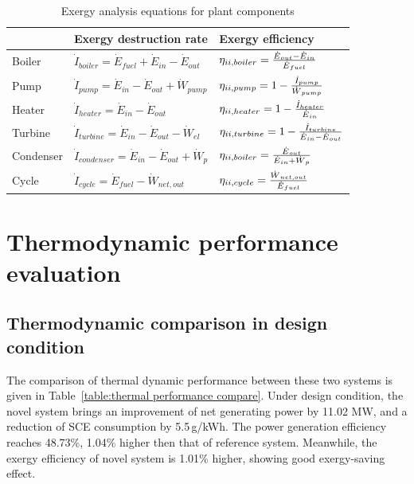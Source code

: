 \documentclass[preprint,12pt]{elsarticle}
\begin{document}

\begin{table}
\caption{Exergy analysis equations for plant components}
\label{tab:exergy equation}
\centering
\begin{tabular}{lll}
\toprule 
 & Exergy destruction rate  & Exergy efficiency\tabularnewline
\midrule
Boiler & $\dot{I}_{boiler}=\dot{E}{}_{fuel}+\dot{E}{}_{in}-\dot{E}{}_{out}$ & $\eta_{\uppercase\expandafter{\romannumeral2},boiler}=\frac{\dot{E}{}_{out}-\dot{E}{}_{in}}{\dot{E}{}_{fuel}}$\tabularnewline
Pump & $\dot{I}_{pump}=\dot{E}{}_{in}-\dot{E}{}_{out}+\dot{W}{}_{pump}$ & $\eta_{\uppercase\expandafter{\romannumeral2},pump}=1-\frac{\dot{I}_{pump}}{\dot{W}{}_{pump}}$\tabularnewline
Heater & $\dot{I}_{heater}=\dot{E}{}_{in}-\dot{E}{}_{out}$ & $\eta_{\uppercase\expandafter{\romannumeral2},heater}=1-\frac{\dot{I}_{heater}}{\dot{E}{}_{in}}$\tabularnewline
Turbine & $\dot{I}_{turbine}=\dot{E}{}_{in}-\dot{E}{}_{out}-\dot{W}{}_{el}$ & $\eta_{\uppercase\expandafter{\romannumeral2},turbine}=1-\frac{\dot{I}_{turbine}}{\dot{E}{}_{in}-\dot{E}{}_{out}}$\tabularnewline
Condenser & $\dot{I}_{condenser}=\dot{E}{}_{in}-\dot{E}{}_{out}+\dot{W}{}_{p}$ & $\eta_{\uppercase\expandafter{\romannumeral2},boiler}=\frac{\dot{E}{}_{out}}{\dot{E}{}_{in}+\dot{W}{}_{p}}$\tabularnewline
Cycle &$\dot{I}_{cycle}=\dot{E}{}_{fuel}-\dot{W}{}_{net,out}$ & $\eta_{\uppercase\expandafter{\romannumeral2},cycle}=\frac{\dot{W}{}_{net,out}}{\dot{E}{}_{fuel}}$\tabularnewline
\bottomrule
\end{tabular}
\end{table}

\section{Thermodynamic performance evaluation} %
\label{sub:Thermodynamic_evaluation}
\subsection{Thermodynamic comparison in design condition}
\label{ssub:desing_compare}
The comparison of thermal dynamic performance between these two systems is given in Table~\ref{table:thermal performance compare}. 
Under design condition, the novel system brings an improvement of net generating power by 11.02 MW, and a reduction of SCE consumption by 5.5\,g/kWh.
The power generation efficiency reaches 48.73\%, 1.04\% higher then that of reference system.
Meanwhile, the exergy efficiency of novel system is 1.01\% higher, showing good exergy-saving effect. 
\end{document}
